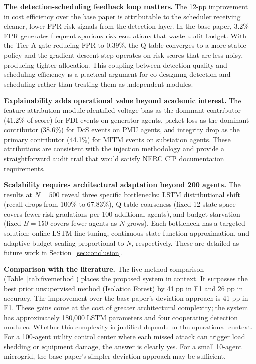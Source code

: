\textbf{The detection-scheduling feedback loop matters.} The 12-pp improvement in cost efficiency
over the base paper is attributable to the scheduler receiving cleaner, lower-FPR risk signals from
the detection layer. In the base paper, 3.2\% FPR generates frequent spurious risk escalations
that waste audit budget. With the Tier-A gate reducing FPR to 0.39\%, the Q-table converges to a
more stable policy and the gradient-descent step operates on risk scores that are less noisy,
producing tighter allocation. This coupling between detection quality and scheduling efficiency is
a practical argument for co-designing detection and scheduling rather than treating them as
independent modules.

\textbf{Explainability adds operational value beyond academic interest.} The feature attribution
module identified voltage bias as the dominant contributor (41.2\% of score) for FDI events on
generator agents, packet loss as the dominant contributor (38.6\%) for DoS events on PMU agents,
and integrity drop as the primary contributor (44.1\%) for MITM events on substation agents. These
attributions are consistent with the injection methodology and provide a straightforward audit
trail that would satisfy NERC CIP documentation requirements.

\textbf{Scalability requires architectural adaptation beyond 200 agents.} The results at $N = 500$
reveal three specific bottlenecks: LSTM distributional shift (recall drops from 100\% to 67.83\%),
Q-table coarseness (fixed 12-state space covers fewer risk gradations per 100 additional agents),
and budget starvation (fixed $B = 150$ covers fewer agents as $N$ grows). Each bottleneck has a
targeted solution: online LSTM fine-tuning, continuous-state function approximation, and adaptive
budget scaling proportional to $N$, respectively. These are detailed as future work in
Section~\ref{sec:conclusion}.

\textbf{Comparison with the literature.} The five-method comparison (Table~\ref{tab:fivemethod})
places the proposed system in context. It surpasses the best prior unsupervised method (Isolation
Forest) by 44 pp in F1 and 26 pp in accuracy. The improvement over the base paper's deviation
approach is 41 pp in F1. These gains come at the cost of greater architectural complexity; the
system has approximately 180,000 LSTM parameters and four cooperating detection modules. Whether
this complexity is justified depends on the operational context. For a 100-agent utility control
center where each missed attack can trigger load shedding or equipment damage, the answer is clearly
yes. For a small 10-agent microgrid, the base paper's simpler deviation approach may be sufficient.

